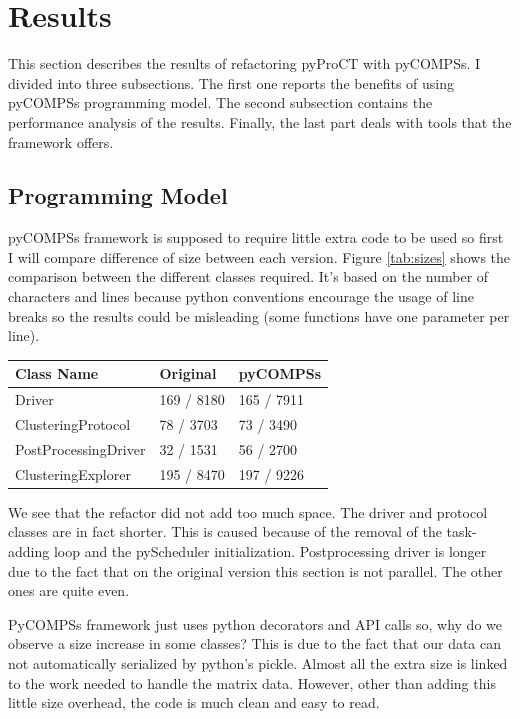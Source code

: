\chapter{Results}


This section describes the results of refactoring pyProCT with pyCOMPSs. I divided into three subsections. The first one reports the benefits of using pyCOMPSs programming model. The second subsection contains the performance analysis of the results. Finally, the last part deals with tools that the framework offers.

\section{Programming Model}

pyCOMPSs framework is supposed to require little extra code to be used so first I will compare difference of size between each version. Figure \ref{tab:sizes} shows the comparison between the different classes required. It's based on the number of characters and lines because python conventions encourage the usage of line breaks so the results could be misleading (some functions have one parameter per line).


\begin{center}
	\begin{tabular}{| R{6cm} | L{3cm} | L{3cm} |}
		\hline
		Class Name & Original & pyCOMPSs \\ 
		\hline
		\hline
		Driver & 169 / 8180  &  165 / 7911 \\
		\hline
		ClusteringProtocol & 78 / 3703 & 73 / 3490 \\
		\hline
		PostProcessingDriver & 32 / 1531 & 56 / 2700 \\
		\hline
		ClusteringExplorer & 195 / 8470 & 197 / 9226 \\ 
		\hline
	\end{tabular}
	\label{tab:sizes}
\end{center}


We see that the refactor did not add too much space. The driver and protocol classes are in fact shorter. This is caused because of the removal of the task-adding loop and the pyScheduler initialization. Postprocessing driver is longer due to the fact that on the original version this section is not parallel. The other ones are quite even.

PyCOMPSs framework just uses python decorators and API calls so, why do we observe a size increase in some classes? This is due to the fact that our data can not automatically serialized by python's pickle. Almost all the extra size is linked to the work needed to handle the matrix data. However, other than adding this little size overhead, the code is much clean and easy to read. 

